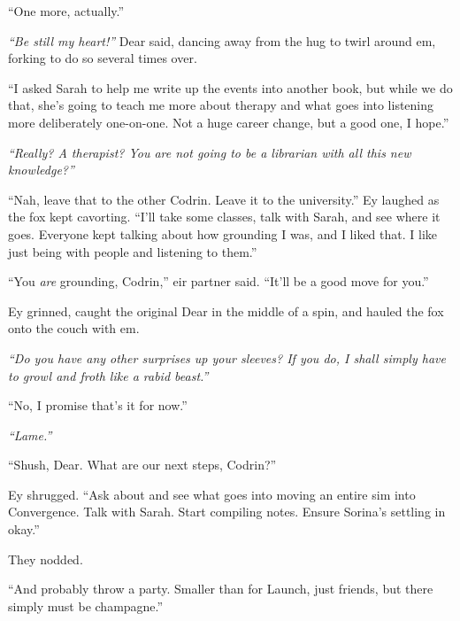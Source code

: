 ``One more, actually.''

\emph{``Be still my heart!''} Dear said, dancing away from the hug to twirl around em, forking to do so several times over.

``I asked Sarah to help me write up the events into another book, but while we do that, she's going to teach me more about therapy and what goes into listening more deliberately one-on-one. Not a huge career change, but a good one, I hope.''

\emph{``Really? A therapist? You are not going to be a librarian with all this new knowledge?''}

``Nah, leave that to the other Codrin. Leave it to the university.'' Ey laughed as the fox kept cavorting. ``I'll take some classes, talk with Sarah, and see where it goes. Everyone kept talking about how grounding I was, and I liked that. I like just being with people and listening to them.''

``You \emph{are} grounding, Codrin,'' eir partner said. ``It'll be a good move for you.''

Ey grinned, caught the original Dear in the middle of a spin, and hauled the fox onto the couch with em.

\emph{``Do you have any other surprises up your sleeves? If you do, I shall simply have to growl and froth like a rabid beast.''}

``No, I promise that's it for now.''

\emph{``Lame.''}

``Shush, Dear. What are our next steps, Codrin?''

Ey shrugged. ``Ask about and see what goes into moving an entire sim into Convergence. Talk with Sarah. Start compiling notes. Ensure Sorina's settling in okay.''

They nodded.

``And probably throw a party. Smaller than for Launch, just friends, but there simply must be champagne.''

